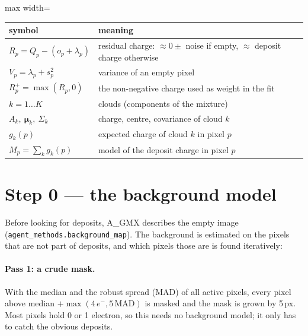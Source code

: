 \documentclass[11pt,a4paper]{article}
\newcommand{\el}{\ensuremath{e^-}}
\newcommand{\AGMX}{A\_GMX}
\newcommand{\code}[1]{\texttt{#1}}
\begin{document}
\begin{table}[H]\centering\small
\begin{adjustbox}{max width=\linewidth}
\begin{tabular}{ll}
\toprule
symbol & meaning \\
\midrule
$R_p = Q_p-(o_p+\lambda_p)$ & residual charge: $\approx0\pm$ noise if empty, $\approx$ deposit charge otherwise \\
$V_p=\lambda_p+s_p^2$ & variance of an empty pixel \\
$R_p^+=\max(R_p,0)$ & the non-negative charge used as weight in the fit \\
$k=1\dots K$ & clouds (components of the mixture) \\
$A_k,\ \bm\mu_k,\ \Sigma_k$ & charge, centre, covariance of cloud $k$ \\
$g_k(p)$ & expected charge of cloud $k$ in pixel $p$ \\
$M_p=\sum_k g_k(p)$ & model of the deposit charge in pixel $p$ \\
\bottomrule
\end{tabular}
\end{adjustbox}
\end{table}

\section{Step 0 --- the background model}\label{sec:bg}

Before looking for deposits, \AGMX{} describes the empty image (\code{agent\_methods.background\_map}). The background is
estimated on the pixels that are not part of deposits, and which pixels those are is found iteratively:

\paragraph{Pass 1: a crude mask.} With the median and the robust spread (MAD) of all active pixels, every pixel above
median $+\max(4\,\el, 5\,\mathrm{MAD})$ is masked and the mask is grown by 5\,px. Most pixels hold 0 or 1 electron, so this
needs no background model; it only has to catch the obvious deposits.
\end{document}
